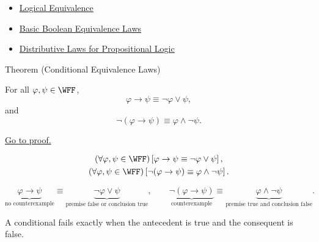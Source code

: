 \begin{dependencies}
\begin{itemize}
  \item \hyperref[def:logical-equivalence-propositional-logic]{Logical Equivalence}
  \item \hyperref[thm:basic-boolean-equivalence-laws-propositional-logic]{Basic Boolean Equivalence Laws}
  \item \hyperref[thm:distributive-laws-propositional-logic]{Distributive Laws for Propositional Logic}
\end{itemize}
\end{dependencies}
\begin{theorembox}{Theorem (Conditional Equivalence Laws)}
\begin{theorem}
\label{thm:conditional-equivalence-laws-propositional-logic}
For all \(\varphi,\psi\in\WFF\),
\[
\varphi\to\psi
\equiv
\neg\varphi\lor\psi,
\]
and
\[
\neg(\varphi\to\psi)
\equiv
\varphi\land\neg\psi.
\]

\noindent\hyperref[prf:conditional-equivalence-laws-propositional-logic]{Go to proof.}
\end{theorem}
\end{theorembox}

\begin{remark*}
\[
\begin{gathered}
(\forall\varphi,\psi\in\WFF)
\left[
\varphi\to\psi
\equiv
\neg\varphi\lor\psi
\right],\\
(\forall\varphi,\psi\in\WFF)
\left[
\neg(\varphi\to\psi)
\equiv
\varphi\land\neg\psi
\right].
\end{gathered}
\]
\end{remark*}

\begin{remark*}
\[
\underbrace{\varphi\to\psi}_{\text{no counterexample}}
\equiv
\underbrace{\neg\varphi\lor\psi}_{\text{premise false or conclusion true}},
\qquad
\underbrace{\neg(\varphi\to\psi)}_{\text{counterexample}}
\equiv
\underbrace{\varphi\land\neg\psi}_{\text{premise true and conclusion false}}.
\]
\end{remark*}

\begin{remark*}[Interpretation]
A conditional fails exactly when the antecedent is true and the consequent is false.
\end{remark*}

